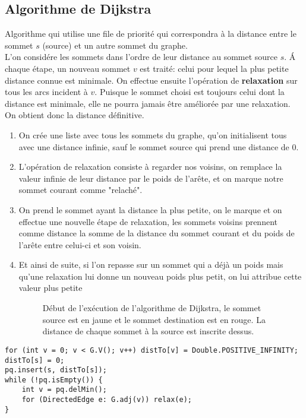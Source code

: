 \documentclass[10pt]{article}
\begin{document}
\subsection{Algorithme de Dijkstra}
Algorithme qui utilise une file de priorité qui correspondra à la distance entre le sommet $s$ (source) et un autre sommet du graphe.
\\L'on considére les sommets dans l'ordre de leur distance au sommet source $s$. Á chaque étape, un nouveau sommet $v$ est traité: celui pour lequel la plus petite distance connue est minimale. On effectue ensuite l'opération de \textbf{relaxation} sur tous les arcs incident à $v$. Puisque le sommet choisi est toujours celui dont la distance est minimale, elle ne pourra jamais être améliorée par une relaxation. On obtient donc la distance définitive.
\begin{enumerate}
\item On crée une liste avec tous les sommets du graphe, qu'on initialisent tous avec une distance infinie, sauf le sommet source qui prend une distance de 0.
\item L'opération de relaxation consiste à regarder nos voisins, on remplace la valeur infinie de leur distance par le poids de l'arête, et on marque notre sommet courant comme "relaché".
\item On prend le sommet ayant la distance la plus petite, on le marque et on effectue une nouvelle étape de relaxation, les sommets voisins prennent comme distance la somme de la distance du sommet courant et du poids de l'arête entre celui-ci et son voisin.
\item Et ainsi de suite, si l'on repasse sur un sommet qui a déjà un poids mais qu'une relaxation lui donne un nouveau poids plus petit, on lui attribue cette valeur plus petite

\begin{figure}[H]
\caption{Début de l'exécution de l'algorithme de Dijkstra, le sommet source est en jaune et le sommet destination est en rouge. La distance de chaque sommet à la source est inscrite dessus.}
\label{fig:cfc_inverse}
\end{figure}

\end{enumerate}
\begin{verbatim}
for (int v = 0; v < G.V(); v++) distTo[v] = Double.POSITIVE_INFINITY;
distTo[s] = 0;
pq.insert(s, distTo[s]);
while (!pq.isEmpty()) {
	int v = pq.delMin();
	for (DirectedEdge e: G.adj(v)) relax(e);
}
\end{verbatim}
\end{document}
